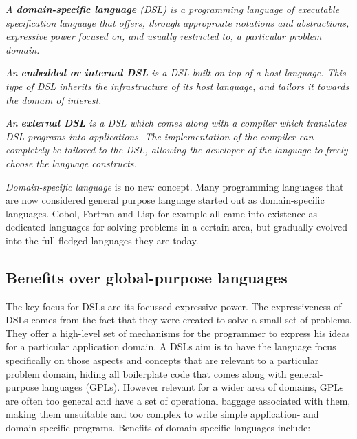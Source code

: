 \begin{definition}
    \textit{A \textbf{domain-specific language} (DSL) is a programming language of executable specification language that offers, through approproate notations and abstractions, expressive power focused on, and usually restricted to, a particular problem domain.}
\end{definition}
\begin{definition}
    \textit{An \textbf{embedded or internal DSL} is a DSL built on top of a host language. This type of DSL inherits the infrastructure of its host language, and tailors it towards the domain of interest.}
\end{definition}
\begin{definition}
    \textit{An \textbf{external DSL} is a DSL which comes along with a compiler which translates DSL programs into applications. The implementation of the compiler can completely be tailored to the DSL, allowing the developer of the language to freely choose the language constructs.}
\end{definition}
 
\textit{Domain-specific language} is no new concept. Many programming languages that are now considered general purpose language started out as domain-specific languages. Cobol, Fortran and Lisp for example all came into existence as dedicated languages for solving problems in a certain area\cite{vanDeursen:2000}, but gradually evolved into the full fledged languages they are today. 

\subsection*{Benefits over global-purpose languages}

The key focus for DSLs are its focussed expressive power. The expressiveness of DSLs comes from the fact that they were created to solve a small set of problems. They offer a high-level set of mechanisms for the programmer to express his ideas for a particular application domain. A DSLs aim is to have the language focus specifically on those aspects and concepts that are relevant to a particular problem domain, hiding all boilerplate code that comes along with general-purpose languages (GPLs). However relevant for a wider area of domains, GPLs are often too general and have a set of operational baggage associated with them, making them unsuitable and too complex to write simple application- and domain-specific programs\cite{FluentInterfacesJava}. Benefits of domain-specific languages include:

